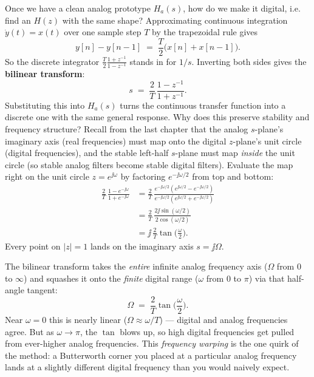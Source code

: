 Once we have a clean analog prototype $H_a(s)$, how do we make it digital, i.e. find an
$H(z)$ with the same shape? Approximating continuous integration $\dot{y}(t)=x(t)$ over one sample step $T$ by the trapezoidal rule gives
\[
y[n] - y[n-1] \;=\; \frac{T}{2}\bigl(x[n] + x[n-1]\bigr).
\]
So the discrete integrator $\frac{T}{2}\frac{1+z^{-1}}{1-z^{-1}}$ stands in for $1/s$. Inverting both sides gives the \textbf{bilinear transform}:
\[
s \;=\; \frac{2}{T}\,\frac{1 - z^{-1}}{1 + z^{-1}}.
\]
Substituting this into $H_a(s)$ turns the continuous transfer function into a
discrete one with the same general response. Why does this preserve stability and frequency structure?
Recall from the last chapter that the analog $s$-plane's imaginary axis (real
frequencies) must map onto the digital $z$-plane's unit circle (digital
frequencies), and the stable left-half $s$-plane must map \emph{inside} the unit
circle (so stable analog filters become stable digital filters). Evaluate the map right on the unit circle $z = e^{\jj\omega}$ by factoring $e^{-\jj\omega/2}$ from top and bottom:
\begin{align*}
\frac{2}{T}\,\frac{1 - e^{-\jj\omega}}{1 + e^{-\jj\omega}}
&= \frac{2}{T}\,\frac{e^{-\jj\omega/2}(e^{\jj\omega/2} - e^{-\jj\omega/2})}{e^{-\jj\omega/2}(e^{\jj\omega/2} + e^{-\jj\omega/2})} \\
&= \frac{2}{T}\,\frac{2\jj\sin(\omega/2)}{2\cos(\omega/2)} \\
&= \jj\,\frac{2}{T}\tan\!\Big(\frac{\omega}{2}\Big).
\end{align*}
Every point on $|z|=1$ lands on the imaginary axis $s = \jj\Omega$.

\begin{happeningbox}
The bilinear transform takes the \emph{entire} infinite analog frequency axis
($\Omega$ from $0$ to $\infty$) and squashes it onto the \emph{finite} digital
range ($\omega$ from $0$ to $\pi$) via that half-angle tangent:
\[
\Omega \;=\; \frac{2}{T}\tan\!\Big(\frac{\omega}{2}\Big).
\]
Near $\omega = 0$ this is nearly linear ($\Omega \approx \omega/T$) --- digital and
analog frequencies agree. But as $\omega \to \pi$, the $\tan$ blows up, so high
digital frequencies get pulled from ever-higher analog frequencies. This
\emph{frequency warping} is the one quirk of the method: a Butterworth corner you
placed at a particular analog frequency lands at a slightly different digital
frequency than you would naively expect.
\end{happeningbox}

